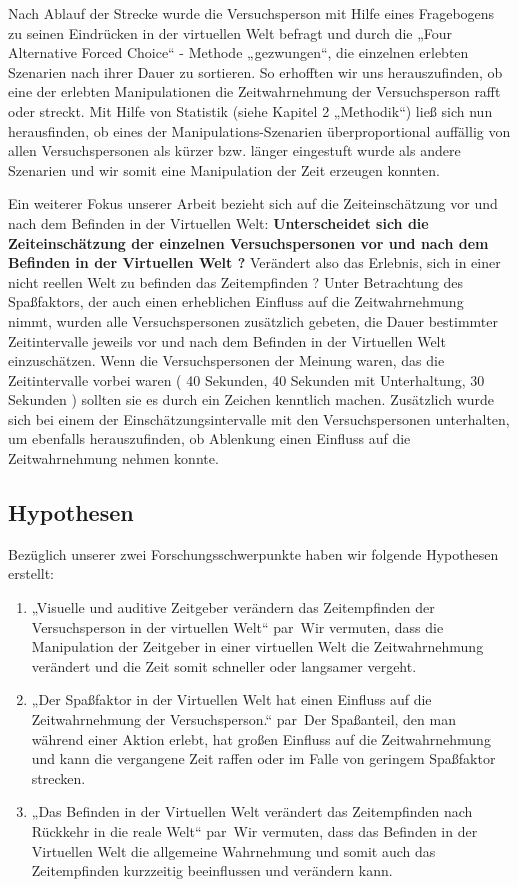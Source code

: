 \documentclass{Paper}
\begin{document}
Nach Ablauf der Strecke wurde die Versuchsperson mit Hilfe eines Fragebogens zu seinen Eindrücken in der virtuellen Welt befragt und durch die „Four Alternative Forced Choice“ - Methode „gezwungen“, die einzelnen erlebten Szenarien nach ihrer Dauer zu sortieren. So erhofften wir uns herauszufinden, ob eine der erlebten Manipulationen die Zeitwahrnehmung der Versuchsperson rafft oder streckt. Mit Hilfe von Statistik (siehe Kapitel 2 „Methodik“) ließ sich nun herausfinden, ob eines der Manipulations-Szenarien überproportional auffällig von allen Versuchspersonen als kürzer bzw. länger eingestuft wurde als andere Szenarien und wir somit eine Manipulation der Zeit erzeugen konnten. 
\par
Ein weiterer Fokus unserer Arbeit bezieht sich auf die Zeiteinschätzung vor und nach dem Befinden in der Virtuellen Welt:
\textbf{Unterscheidet sich die Zeiteinschätzung der einzelnen Versuchspersonen vor und nach dem Befinden in der Virtuellen Welt ?} Verändert also das Erlebnis, sich in einer nicht reellen Welt zu befinden das Zeitempfinden ?
Unter Betrachtung des Spaßfaktors, der auch einen erheblichen Einfluss auf die Zeitwahrnehmung nimmt, wurden alle Versuchspersonen zusätzlich gebeten, die Dauer bestimmter Zeitintervalle jeweils vor und nach dem Befinden in der Virtuellen Welt einzuschätzen. Wenn die Versuchspersonen der Meinung waren, das die Zeitintervalle vorbei waren ( 40 Sekunden, 40 Sekunden mit Unterhaltung, 30 Sekunden ) sollten sie es durch ein Zeichen kenntlich machen. Zusätzlich wurde sich bei einem der Einschätzungsintervalle mit den Versuchspersonen unterhalten, um ebenfalls herauszufinden, ob Ablenkung einen Einfluss auf die Zeitwahrnehmung nehmen konnte.


\subsection{Hypothesen}

Bezüglich unserer zwei Forschungsschwerpunkte haben wir folgende Hypothesen erstellt:
\begin{enumerate}
\item „Visuelle und auditive Zeitgeber verändern das Zeitempfinden der Versuchsperson in der virtuellen Welt“
par\
Wir vermuten, dass die Manipulation der Zeitgeber in einer virtuellen Welt die Zeitwahrnehmung verändert und die Zeit somit schneller oder langsamer vergeht.

\item „Der Spaßfaktor in der Virtuellen Welt hat einen Einfluss auf die Zeitwahrnehmung der Versuchsperson.“
par\
Der Spaßanteil, den man während einer Aktion erlebt, hat großen Einfluss auf die Zeitwahrnehmung und kann die vergangene Zeit raffen oder im Falle von geringem Spaßfaktor strecken.


\item „Das Befinden in der Virtuellen Welt verändert das Zeitempfinden nach Rückkehr in die reale Welt“
par\
Wir vermuten, dass das Befinden in der Virtuellen Welt die allgemeine Wahrnehmung und somit auch das Zeitempfinden kurzzeitig beeinflussen und verändern kann.
\end{enumerate}
\end{document}
